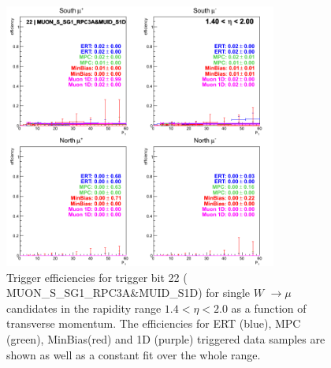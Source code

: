 \begin{figure}[ht]
\begin{center}
\includegraphics[width=0.8\textwidth]{./figures/run13_trigeffipt_eta1_trig22_lin.png}
\caption{\label{fig:run13_trigeffipt_eta1_nper0_trig22_lin} Trigger efficiencies for trigger bit 22 ( MUON\_S\_SG1\_RPC3A\&MUID\_S1D) for single $W$ $\rightarrow \mu$ candidates in the rapidity range $ 1.4 < \eta < 2.0$ as a function of transverse momentum. The efficiencies for ERT (blue), MPC (green), MinBias(red) and 1D (purple) triggered data samples are shown as well as a constant fit over the whole range.}
\end{center}
\end{figure}
